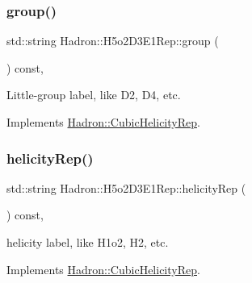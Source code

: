 \mbox{\label{structHadron_1_1H5o2D3E1Rep_a80104355e2d046afbfe385b15b96b79a}} 
\subsubsection{\texorpdfstring{group()}{group()}\hspace{0.1cm}{\footnotesize\ttfamily [5/5]}}
{\footnotesize\ttfamily std\+::string Hadron\+::\+H5o2\+D3\+E1\+Rep\+::group (\begin{DoxyParamCaption}{ }\end{DoxyParamCaption}) const\hspace{0.3cm}{\ttfamily [inline]}, {\ttfamily [virtual]}}

Little-\/group label, like D2, D4, etc. 

Implements \mbox{\hyperlink{structHadron_1_1CubicHelicityRep_a101a7d76cd8ccdad0f272db44b766113}{Hadron\+::\+Cubic\+Helicity\+Rep}}.

\mbox{\label{structHadron_1_1H5o2D3E1Rep_a8b5b9e72ba3d6656c0c77e111bdd140a}} 
\subsubsection{\texorpdfstring{helicityRep()}{helicityRep()}\hspace{0.1cm}{\footnotesize\ttfamily [1/3]}}
{\footnotesize\ttfamily std\+::string Hadron\+::\+H5o2\+D3\+E1\+Rep\+::helicity\+Rep (\begin{DoxyParamCaption}{ }\end{DoxyParamCaption}) const\hspace{0.3cm}{\ttfamily [inline]}, {\ttfamily [virtual]}}

helicity label, like H1o2, H2, etc. 

Implements \mbox{\hyperlink{structHadron_1_1CubicHelicityRep_af1096946b7470edf0a55451cc662f231}{Hadron\+::\+Cubic\+Helicity\+Rep}}.

\mbox{\label{structHadron_1_1H5o2D3E1Rep_a8b5b9e72ba3d6656c0c77e111bdd140a}} 
